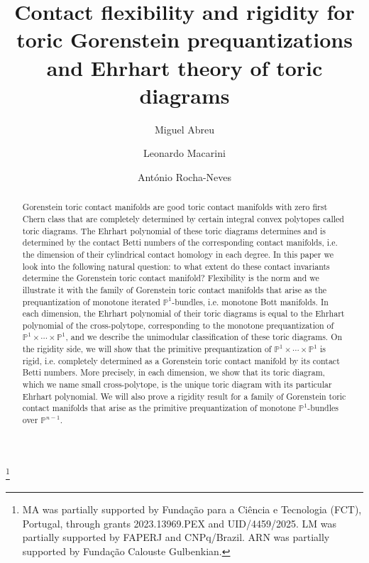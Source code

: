 \documentclass[a4paper,11pt,reqno]{amsart}
\newcommand{\CP}{\mathbb P}
\begin{document}
\title[Contact rigidity/flexibility and Ehrhart theory of toric diagrams]
{Contact flexibility and rigidity for toric Gorenstein prequantizations and 
Ehrhart theory of toric diagrams}

\author[M.~Abreu]{Miguel Abreu}
\author[L.~Macarini]{Leonardo Macarini}
\author[A.~Rocha-Neves]{Ant\'{o}nio Rocha-Neves}

\address{Center for Mathematical Analysis, Geometry and Dynamical Systems,
Instituto Superior T\'ecnico, Universidade de Lisboa, 
Av. Rovisco Pais, 1049-001 Lisboa, Portugal}

\address{IMPA, Estrada Dona Castorina, 110, Rio de Janeiro, 22460-320, Brazil}
  

\thanks{MA was partially supported by Funda\c c\~ao para a Ci\^encia e Tecnologia (FCT), Portugal, 
through grants 2023.13969.PEX and UID/4459/2025.  LM was partially supported by FAPERJ and CNPq/Brazil. 
ARN was partially supported by Funda\c c\~ao Calouste Gulbenkian.}

\begin{abstract}
Gorenstein toric contact manifolds are good toric contact manifolds with zero first Chern class that
are completely determined by certain integral convex polytopes called toric diagrams. The Ehrhart
polynomial of these toric diagrams determines and is determined by the contact Betti numbers of 
the corresponding contact manifolds, i.e. the dimension of their cylindrical contact homology in each
degree. In this paper we look into the following natural question: to what extent do these contact 
invariants determine the Gorenstein toric contact manifold? Flexibility is the norm and we illustrate 
it with the family of Gorenstein toric contact manifolds that arise as the prequantization 
of monotone iterated $\CP^1$-bundles, i.e. monotone Bott manifolds. In each dimension, the Ehrhart polynomial 
of their toric diagrams is equal to the Ehrhart polynomial of the cross-polytope, corresponding to the 
monotone prequantization of  $\CP^1 \times \cdots \times \CP^1$, and we describe the unimodular 
classification of these toric diagrams. On the rigidity side, we will show that the primitive prequantization 
of $\CP^1 \times \cdots \times \CP^1$ is rigid, i.e. completely determined as a Gorenstein toric contact 
manifold by its contact Betti numbers. More precisely, in each dimension, we show that its toric diagram, 
which we name small cross-polytope, is the unique toric diagram with its particular Ehrhart polynomial. 
We will also prove a rigidity result for a family of Gorenstein toric contact manifolds that arise as the primitive 
prequantization of monotone $\CP^1$-bundles over $\CP^{n-1}$.
\end{abstract}
\end{document}
